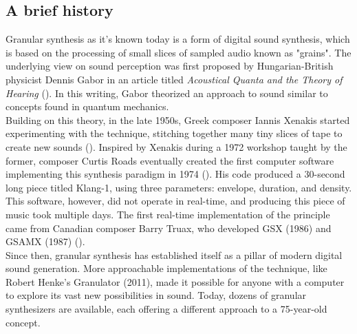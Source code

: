 \documentclass[10pt, twocolumn]{IEEEtran}
\begin{document}
\subsection{A brief history}
Granular synthesis as it's known today is a form of digital sound synthesis, which is based on the processing of small slices of sampled audio known as "grains". The underlying view on sound perception was first proposed by Hungarian-British physicist Dennis Gabor in an article titled \textit{Acoustical Quanta and the Theory of Hearing} (\cite{gabor47}). In this writing, Gabor theorized an approach to sound similar to concepts found in quantum mechanics.\\ Building on this theory, in the late 1950s, Greek composer Iannis Xenakis started experimenting with the technique, stitching together many tiny slices of tape to create new sounds (\cite{robindore96}). Inspired by Xenakis during a 1972 workshop taught by the former, composer Curtis Roads eventually created the first computer software implementing this synthesis paradigm in 1974 (\cite{opie03}). His code produced a 30-second long piece titled Klang-1, using three parameters: envelope, duration, and density. This software, however, did not operate in real-time, and producing this piece of music took multiple days. The first real-time implementation of the principle came from Canadian composer Barry Truax, who developed GSX (1986) and GSAMX (1987) (\cite{truax88}). \\
Since then, granular synthesis has established itself as a pillar of modern digital sound generation. More approachable implementations of the technique, like Robert Henke's Granulator (2011), made it possible for anyone with a computer to explore its vast new possibilities in sound. Today, dozens of granular synthesizers are available, each offering a different approach to a 75-year-old concept.

%
\end{document}
